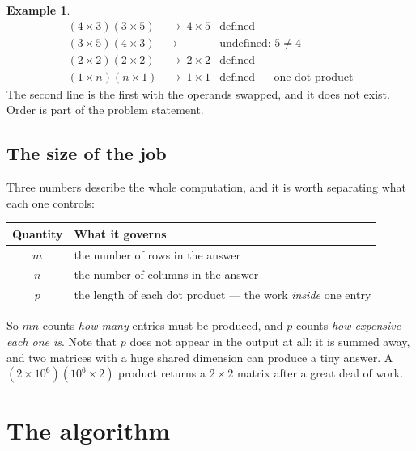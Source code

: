 \documentclass[11pt]{article}
\theoremstyle{plain}
\theoremstyle{definition}
\newtheorem{ex}{Example}[section]
\theoremstyle{remark}
\begin{document}
\begin{ex}
\[
  \begin{array}{lll}
    (4\times3)(3\times5) & \to\ 4\times5   & \text{defined}\\
    (3\times5)(4\times3) & \to\ \text{---} & \text{undefined: } 5\neq4\\
    (2\times2)(2\times2) & \to\ 2\times2   & \text{defined}\\
    (1\times n)(n\times1) & \to\ 1\times1  & \text{defined --- one dot product}
  \end{array}
\]
The second line is the first with the operands swapped, and it does not exist.
Order is part of the problem statement.
\end{ex}

\subsection{The size of the job}
Three numbers describe the whole computation, and it is worth separating what
each one controls:
\begin{center}
\renewcommand{\arraystretch}{1.3}
\begin{tabular}{@{}c l@{}}
\toprule
\textbf{Quantity} & \textbf{What it governs} \\
\midrule
$m$ & the number of rows in the answer \\
$n$ & the number of columns in the answer \\
$p$ & the length of each dot product --- the work \emph{inside} one entry \\
\bottomrule
\end{tabular}
\end{center}

\noindent So $mn$ counts \emph{how many} entries must be produced, and $p$
counts \emph{how expensive each one is}. Note that $p$ does not appear in the
output at all: it is summed away, and two matrices with a huge shared dimension
can produce a tiny answer. A $(2\times10^{6})(10^{6}\times2)$ product returns a
$2\times2$ matrix after a great deal of work.

\section{The algorithm}
\end{document}
